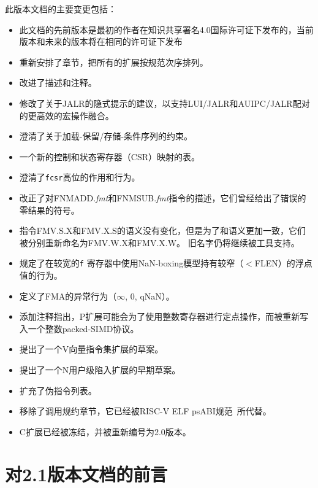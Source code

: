 此版本文档的主要变更包括：
\begin{itemize}
\parskip 0pt
\itemsep 1pt
\item 此文档的先前版本是最初的作者在知识共享署名4.0国际许可证下发布的，当前版本和未来的版本将在相同的许可证下发布
\item 重新安排了章节，把所有的扩展按规范次序排列。
\item 改进了描述和注释。
\item 修改了关于JALR的隐式提示的建议，以支持LUI/JALR和AUIPC/JALR配对的更高效的宏操作融合。
\item 澄清了关于加载-保留/存储-条件序列的约束。
\item 一个新的控制和状态寄存器（CSR）映射的表。
\item 澄清了{\tt fcsr}高位的作用和行为。
\item 改正了对FNMADD.{\em fmt}和FNMSUB.{\em fmt}指令的描述，它们曾经给出了错误的零结果的符号。
\item 指令FMV.S.X和FMV.X.S的语义没有变化，但是为了和语义更加一致，它们被分别重新命名为FMV.W.X和FMV.X.W。
      旧名字仍将继续被工具支持。
\item 规定了在较宽的{\tt f} 寄存器中使用NaN-boxing模型持有较窄（$<$FLEN）的浮点值的行为。
\item 定义了FMA的异常行为（$\infty$, 0, qNaN）。
\item 添加注释指出，P扩展可能会为了使用整数寄存器进行定点操作，而被重新写入一个整数packed-SIMD协议。
\item 提出了一个V向量指令集扩展的草案。
\item 提出了一个N用户级陷入扩展的早期草案。
\item 扩充了伪指令列表。
\item 移除了调用规约章节，它已经被RISC-V ELF psABI规范~\cite{riscv-elf-psabi}所代替。
\item C扩展已经被冻结，并被重新编号为2.0版本。
\end{itemize}

\FloatBarrier

\section*{对2.1版本文档的前言}

